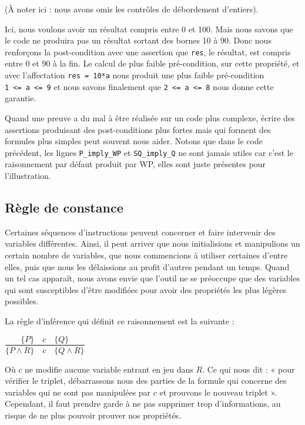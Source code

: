 \documentclass[12pt,francais,]{scrbook}
\begin{document}
(À noter ici : nous avons omis les contrôles de débordement d'entiers).

Ici, nous voulons avoir un résultat compris entre 0 et 100. Mais nous
savons que le code ne produira pas un résultat sortant des bornes 10 à
90. Donc nous renforçons la post-condition avec une assertion que
\texttt{res}, le résultat, est compris entre 0 et 90 à la fin. Le calcul
de plus faible pré-condition, sur cette propriété, et avec l'affectation
\texttt{res\ =\ 10*a} nous produit une plus faible pré-condition
\texttt{1\ \textless{}=\ a\ \textless{}=\ 9} et nous savons finalement
que \texttt{2\ \textless{}=\ a\ \textless{}=\ 8} nous donne cette
garantie.

Quand une preuve a du mal à être réalisée sur un code plus complexe,
écrire des assertions produisant des post-conditions plus fortes mais
qui forment des formules plus simples peut souvent nous aider. Notons
que dans le code précédent, les lignes \texttt{P\_imply\_WP} et
\texttt{SQ\_imply\_Q} ne sont jamais utiles car c'est le raisonnement
par défaut produit par WP, elles sont juste présentes pour
l'illustration.

\subsection{Règle de constance}\label{ruxe8gle-de-constance}

Certaines séquences d'instructions peuvent concerner et faire intervenir
des variables différentes. Ainsi, il peut arriver que nous initialisions
et manipulions un certain nombre de variables, que nous commencions à
utiliser certaines d'entre elles, puis que nous les délaissions au
profit d'autres pendant un temps. Quand un tel cas apparaît, nous avons
envie que l'outil ne se préoccupe que des variables qui sont
susceptibles d'être modifiées pour avoir des propriétés les plus légères
possibles.

La règle d'inférence qui définit ce raisonnement est la suivante :

\begin{center}
\(\dfrac{\{P\}\quad c\quad \{Q\}}{\{P \wedge R\}\quad c\quad \{Q \wedge R\}}\)
\end{center}

Où \(c\) ne modifie aucune variable entrant en jeu dans \(R\). Ce qui
nous dit : « pour vérifier le triplet, débarrassons nous des parties de
la formule qui concerne des variables qui ne sont pas manipulées par
\(c\) et prouvons le nouveau triplet ». Cependant, il faut prendre garde
à ne pas supprimer trop d'informations, au risque de ne plus pouvoir
prouver nos propriétés.
\end{document}
